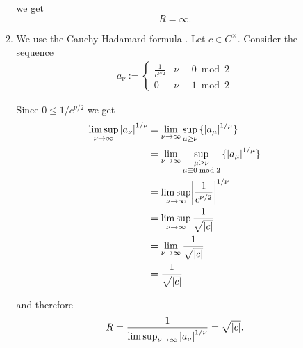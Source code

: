 \begin{enumerate}[label = \textbf{Exercise \arabic*.},wide = 0pt, itemsep=1.5ex]
\begin{enumerate}[label = (\alph*),wide = 0pt, itemsep=1.5ex]
				\noindent we get
				\begin{equation}
					R = \infty.
				\end{equation}

			\item We use the Cauchy-Hadamard formula \cite[99]{remmert2002funktionentheorie}. Let $c \in C^\times$. Consider the sequence
				\begin{align*}
					a_\nu := \begin{cases}
						\frac{1}{c^{\nu/2}}& \nu \equiv 0 \bmod 2\\
						0 & \nu \equiv 1 \bmod 2
					\end{cases}
				\end{align*}

				Since $0 \leq 1/c^{\nu/2}$ we get
				\begin{align*}
					\limsup_{\nu \to \infty} \abs[0]{a_\nu}^{1/\nu} &= \lim_{\nu \to \infty}\sup_{\mu \geq \nu} \cbr[0]{\abs[0]{a_\mu}^{1/\mu}}\\
					&= \lim_{\nu \to \infty}\sup_{\substack{\mu \geq \nu\\\mu \equiv 0 \bmod 2}}\cbr[0]{\abs[0]{a_\mu}^{1/\mu}}\\
					&= \limsup_{\nu \to \infty} \abs[3]{\frac{1}{c^{\nu/2}}}^{1/\nu}\\
					&= \limsup_{\nu \to \infty} \frac{1}{\sqrt{\abs[0]{c}}}\\
					&= \lim_{\nu \to \infty} \frac{1}{\sqrt{\abs[0]{c}}}\\
					&= \frac{1}{\sqrt{\abs[0]{c}}}
				\end{align*}

				\noindent and therefore
				\begin{equation}
					R = \frac{1}{\limsup_{\nu \to \infty} \abs[0]{a_\nu}^{1/\nu}} = \sqrt{\abs[0]{c}}.
				\end{equation}
		\end{enumerate}


\end{enumerate}
